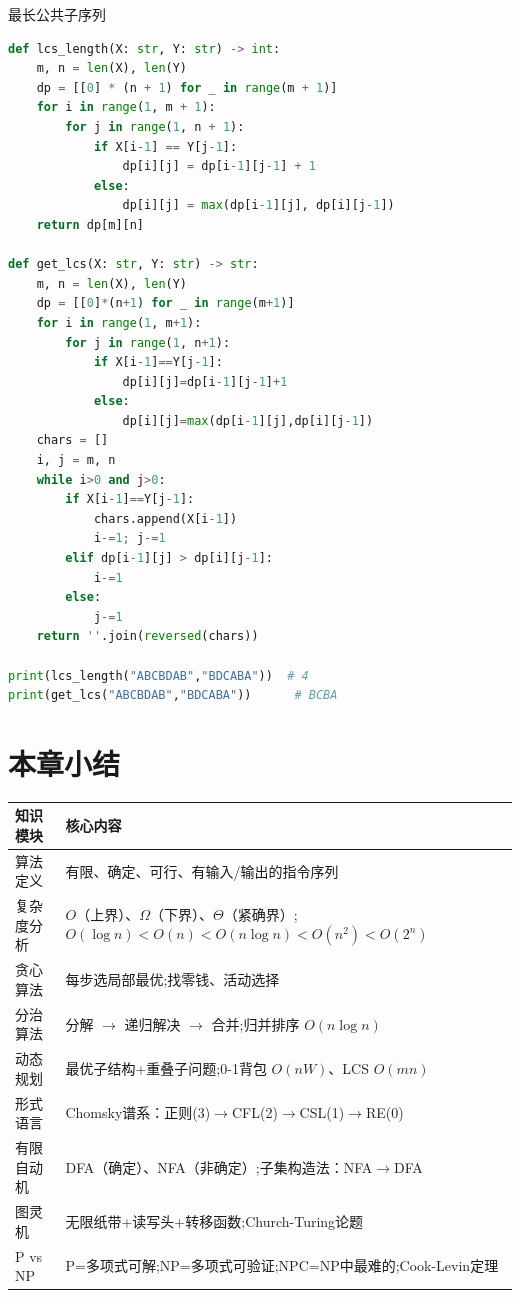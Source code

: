 \begin{mycode}{最长公共子序列}
\begin{lstlisting}[language=Python]
def lcs_length(X: str, Y: str) -> int:
    m, n = len(X), len(Y)
    dp = [[0] * (n + 1) for _ in range(m + 1)]
    for i in range(1, m + 1):
        for j in range(1, n + 1):
            if X[i-1] == Y[j-1]:
                dp[i][j] = dp[i-1][j-1] + 1
            else:
                dp[i][j] = max(dp[i-1][j], dp[i][j-1])
    return dp[m][n]

def get_lcs(X: str, Y: str) -> str:
    m, n = len(X), len(Y)
    dp = [[0]*(n+1) for _ in range(m+1)]
    for i in range(1, m+1):
        for j in range(1, n+1):
            if X[i-1]==Y[j-1]:
                dp[i][j]=dp[i-1][j-1]+1
            else:
                dp[i][j]=max(dp[i-1][j],dp[i][j-1])
    chars = []
    i, j = m, n
    while i>0 and j>0:
        if X[i-1]==Y[j-1]:
            chars.append(X[i-1])
            i-=1; j-=1
        elif dp[i-1][j] > dp[i][j-1]:
            i-=1
        else:
            j-=1
    return ''.join(reversed(chars))

print(lcs_length("ABCBDAB","BDCABA"))  # 4
print(get_lcs("ABCBDAB","BDCABA"))      # BCBA
\end{lstlisting}
\end{mycode}

\section*{本章小结}

\begin{table}[H]
\centering
\begin{tabular}{lp{10cm}}
\toprule
知识模块 & 核心内容 \\
\midrule
算法定义 & 有限、确定、可行、有输入/输出的指令序列 \\
复杂度分析 & \(O\)（上界）、\(\Omega\)（下界）、\(\Theta\)（紧确界）;\(O(\log n)<O(n)<O(n\log n)<O(n^2)<O(2^n)\) \\
贪心算法 & 每步选局部最优;找零钱、活动选择 \\
分治算法 & 分解 \(\to\) 递归解决 \(\to\) 合并;归并排序 \(O(n\log n)\) \\
动态规划 & 最优子结构+重叠子问题;0-1背包 \(O(nW)\)、LCS \(O(mn)\) \\
形式语言 & Chomsky谱系：正则(3)\(\to\)CFL(2)\(\to\)CSL(1)\(\to\)RE(0) \\
有限自动机 & DFA（确定）、NFA（非确定）;子集构造法：NFA\(\to\)DFA \\
图灵机 & 无限纸带+读写头+转移函数;Church-Turing论题 \\
P vs NP & P=多项式可解;NP=多项式可验证;NPC=NP中最难的;Cook-Levin定理 \\
\bottomrule
\end{tabular}
\end{table}
